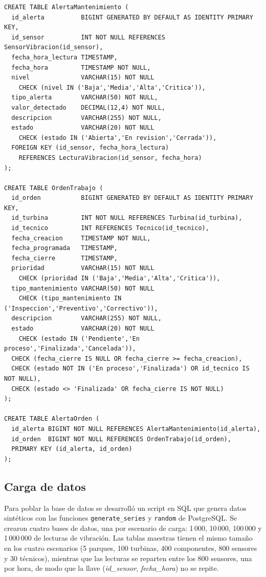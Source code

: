 \documentclass[11pt,a4paper]{article}
\begin{document}
\begin{lstlisting}
CREATE TABLE AlertaMantenimiento (
  id_alerta          BIGINT GENERATED BY DEFAULT AS IDENTITY PRIMARY KEY,
  id_sensor          INT NOT NULL REFERENCES SensorVibracion(id_sensor),
  fecha_hora_lectura TIMESTAMP,
  fecha_hora         TIMESTAMP NOT NULL,
  nivel              VARCHAR(15) NOT NULL
    CHECK (nivel IN ('Baja','Media','Alta','Critica')),
  tipo_alerta        VARCHAR(50) NOT NULL,
  valor_detectado    DECIMAL(12,4) NOT NULL,
  descripcion        VARCHAR(255) NOT NULL,
  estado             VARCHAR(20) NOT NULL
    CHECK (estado IN ('Abierta','En revision','Cerrada')),
  FOREIGN KEY (id_sensor, fecha_hora_lectura)
    REFERENCES LecturaVibracion(id_sensor, fecha_hora)
);

CREATE TABLE OrdenTrabajo (
  id_orden           BIGINT GENERATED BY DEFAULT AS IDENTITY PRIMARY KEY,
  id_turbina         INT NOT NULL REFERENCES Turbina(id_turbina),
  id_tecnico         INT REFERENCES Tecnico(id_tecnico),
  fecha_creacion     TIMESTAMP NOT NULL,
  fecha_programada   TIMESTAMP,
  fecha_cierre       TIMESTAMP,
  prioridad          VARCHAR(15) NOT NULL
    CHECK (prioridad IN ('Baja','Media','Alta','Critica')),
  tipo_mantenimiento VARCHAR(50) NOT NULL
    CHECK (tipo_mantenimiento IN ('Inspeccion','Preventivo','Correctivo')),
  descripcion        VARCHAR(255) NOT NULL,
  estado             VARCHAR(20) NOT NULL
    CHECK (estado IN ('Pendiente','En proceso','Finalizada','Cancelada')),
  CHECK (fecha_cierre IS NULL OR fecha_cierre >= fecha_creacion),
  CHECK (estado NOT IN ('En proceso','Finalizada') OR id_tecnico IS NOT NULL),
  CHECK (estado <> 'Finalizada' OR fecha_cierre IS NOT NULL)
);

CREATE TABLE AlertaOrden (
  id_alerta BIGINT NOT NULL REFERENCES AlertaMantenimiento(id_alerta),
  id_orden  BIGINT NOT NULL REFERENCES OrdenTrabajo(id_orden),
  PRIMARY KEY (id_alerta, id_orden)
);
\end{lstlisting}

\subsection{Carga de datos}

Para poblar la base de datos se desarrolló un script en SQL que genera datos
sintéticos con las funciones \texttt{generate\_series} y \texttt{random} de
PostgreSQL. Se crearon cuatro bases de datos, una por escenario de carga:
1\,000, 10\,000, 100\,000 y 1\,000\,000 de lecturas de vibración. Las tablas
maestras tienen el mismo tamaño en los cuatro escenarios (5 parques, 100
turbinas, 400 componentes, 800 sensores y 30 técnicos), mientras que las
lecturas se reparten entre los 800 sensores, una por hora, de modo que la llave
(\textit{id\_sensor}, \textit{fecha\_hora}) no se repite.
\end{document}
